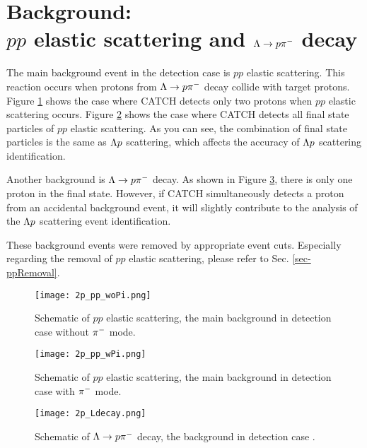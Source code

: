 \section{Background:\\ $pp$ elastic scattering and $\Lambda\to p\pi^{-}$ decay}
The main background event in the detection case  is $pp$ elastic scattering. This reaction occurs when protons from $\Lambda\to p\pi^{-}$ decay collide with target protons. Figure \ref{fig-2p_pp_woPi} shows the case where CATCH detects only two protons when $pp$ elastic scattering occurs. Figure \ref{fig-2p_pp_wPi} shows the case where CATCH detects all final state particles of $pp$ elastic scattering. As you can see, the combination of final state particles is the same as $\Lambda p$ scattering, which affects the accuracy of $\Lambda p$ scattering identification.

Another background is $\Lambda\to p\pi^{-}$ decay. As shown in Figure \ref{fig-2p_Ldecay}, there is only one proton in the final state. However, if CATCH simultaneously detects a proton from an accidental background event, it will slightly contribute to the analysis of the $\Lambda p$ scattering event identification.

These background events were removed by appropriate event cuts. Especially regarding the removal of $pp$ elastic scattering, please refer to Sec. \ref{sec-ppRemoval}.

\begin{figure}[!h]
  \begin{center}
    \texttt{[image: 2p\_pp\_woPi.png]}
    \caption{Schematic of $pp$ elastic scattering, the main background in detection case  without $\pi^{-}$ mode.}
    \label{fig-2p_pp_woPi}
  \end{center}
\end{figure}

\begin{figure}[!h]
  \begin{center}
    \texttt{[image: 2p\_pp\_wPi.png]}
    \caption{Schematic of $pp$ elastic scattering, the main background in detection case  with $\pi^{-}$ mode. }
    \label{fig-2p_pp_wPi} 
  \end{center}
\end{figure}

\begin{figure}[!h]
  \begin{center}
    \texttt{[image: 2p\_Ldecay.png]}
    \caption{Schematic of $\Lambda\to p\pi^{-}$ decay, the background in detection case . }
    \label{fig-2p_Ldecay}
  \end{center}
\end{figure}


